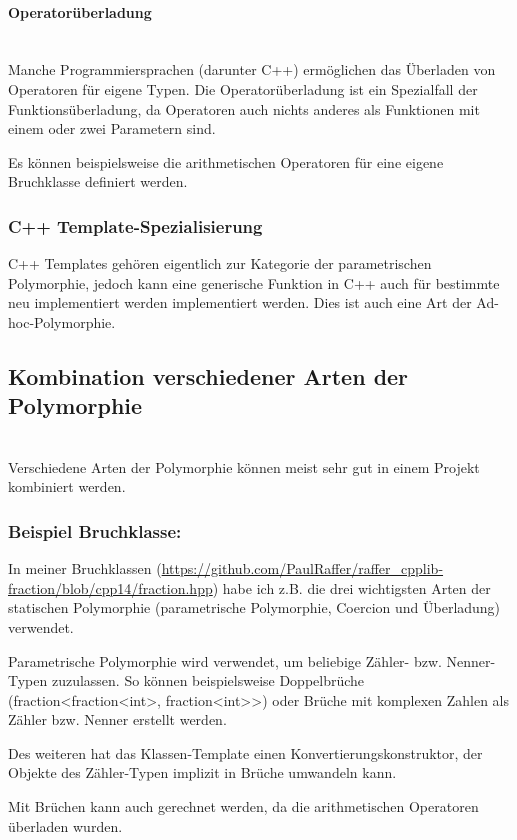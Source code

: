 			\paragraph{Operatorüberladung}\mbox{}\\
				Manche Programmiersprachen (darunter C++) ermöglichen das Überladen von Operatoren für eigene Typen. Die
				Operatorüberladung ist ein Spezialfall der Funktionsüberladung, da Operatoren auch nichts anderes als
				Funktionen mit einem oder zwei Parametern sind.
				
				Es können beispielsweise die arithmetischen Operatoren für eine eigene Bruchklasse definiert werden.
				
		\subsubsection{C++ Template-Spezialisierung}
			C++ Templates gehören eigentlich zur Kategorie der parametrischen Polymorphie, jedoch kann eine generische Funktion in C++ auch für
			bestimmte neu implementiert werden implementiert werden. Dies ist auch eine Art der Ad-hoc-Polymorphie.
			
	\subsection{Kombination verschiedener Arten der Polymorphie}\mbox{}\\
		Verschiedene Arten der Polymorphie können meist sehr gut in einem Projekt kombiniert werden.
		\subsubsection*{Beispiel Bruchklasse:}
			In meiner Bruchklassen (\url{https://github.com/PaulRaffer/raffer_cpplib-fraction/blob/cpp14/fraction.hpp}) habe ich z.B. die
			drei wichtigsten Arten der statischen Polymorphie (parametrische Polymorphie, Coercion und Überladung) verwendet.
			
			Parametrische Polymorphie wird verwendet, um beliebige Zähler- bzw. Nenner-Typen zuzulassen. So können beispielsweise
			Doppelbrüche (fraction<fraction<int>, fraction<int>>) oder Brüche mit komplexen Zahlen als Zähler bzw. Nenner erstellt
			werden.
			
			Des weiteren hat das Klassen-Template einen Konvertierungskonstruktor, der Objekte des Zähler-Typen implizit in Brüche
			umwandeln kann.
			
			Mit Brüchen kann auch gerechnet werden, da die arithmetischen Operatoren überladen wurden.